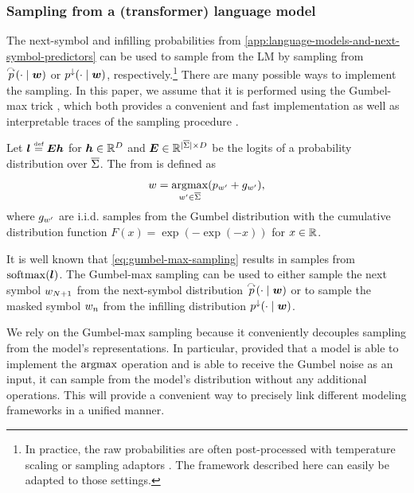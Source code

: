 \subsubsection{Sampling from a (transformer) language model} \label{app:sampling-from-language-models}
The next-symbol and infilling probabilities from \cref{app:language-models-and-next-symbol-predictors} can be used to sample from the LM by sampling from ${{\overset{\curvearrowright}{{{p}}}}(\cdot \mid {{\boldsymbol{w}}})}$ or ${{{{p}}^{\downarrow}}(\cdot \mid {{\boldsymbol{w}}})}$, respectively.\footnote{In practice, the raw probabilities are often post-processed with temperature scaling or sampling adaptors \citep{amini-etal-2023-generating}. The framework described here can easily be adapted to those settings.}
There are many possible ways to implement the sampling.
In this paper, we assume that it is performed using the Gumbel-max trick \citep{pmlr-v97-oberst19a}, which both provides a convenient and fast implementation as well as interpretable traces of the sampling procedure \citep{chatzi2024counterfactual,ravfogel2025gumbel,benz2025evaluation}.
\begin{definition} \label{def:gumbel-max-sampling}
   Let ${{{\bm{l}}}} \mathrel{\stackrel{\textnormal{\tiny def}}{=}} {{{{{\bm{E}}}}}} {{{{{\bm{h}}}}}}$ for ${{{{{\bm{h}}}}}}\in{{\mathbb{R}}}^{{{D}}}$ and ${{{{{\bm{E}}}}}} \in {{\mathbb{R}}}^{{{|{{\overline{{{\Sigma}}}}}|}} \times {{D}}}$ be the logits of a probability distribution over ${{\overline{{{\Sigma}}}}}$.
   The  from is defined as
   \begin{equation} \label{eq:gumbel-max-sampling}
      {{w}} = \operatorname*{{{argmax}}}_{{{w}}' \in {{\overline{{{\Sigma}}}}}} ({{{p}}}_{{{w}}'} + g_{{{w}}'}),
   \end{equation}
   where $g_{{{w}}'}$ are i.i.d. samples from the Gumbel distribution with the cumulative distribution function $F(x) = \exp(-\exp(-x))$ for $x \in {{\mathbb{R}}}$.
\end{definition}
It is well known that \cref{eq:gumbel-max-sampling} results in samples from $\softmaxFun{\vl}{}$.
The Gumbel-max sampling can be used to either sample the next symbol ${{w}}_{{{N}} + 1}$ from the next-symbol distribution ${{\overset{\curvearrowright}{{{p}}}}(\cdot \mid {{\boldsymbol{w}}})}$ or to sample the masked symbol ${{w}}_{{n}}$ from the infilling distribution ${{{{p}}^{\downarrow}}(\cdot \mid {{\boldsymbol{w}}})}$.

We rely on the Gumbel-max sampling because it conveniently decouples sampling from the model's representations.
In particular, provided that a model is able to implement the $\operatorname*{{{argmax}}}$ operation and is able to receive the Gumbel noise as an input, it can sample from the model's distribution without any additional operations.
This will provide a convenient way to precisely link different modeling frameworks in a unified manner.

